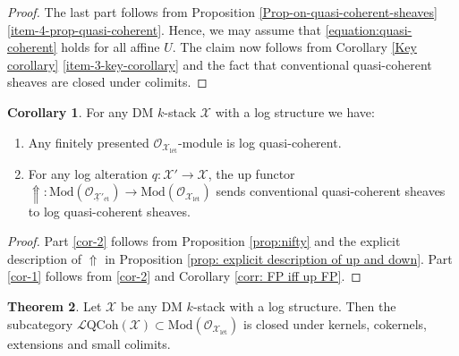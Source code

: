 \documentclass[11pt]{amsart}
\theoremstyle{definition}
\theoremstyle{definition}
\newtheorem{theorem}{Theorem}[subsection]
\newtheorem{corollary}[theorem]{Corollary}
\newcommand{\cL}{\mathcal{L}}
\newcommand{\cO}{\mathcal{O}}
\newcommand{\cX}{\mathcal{X}}
\newcommand{\ul}[1]{\underline{#1}}
\newcommand{\cal}{\mathcal}
\def\cL{{\cal L}}
\def\cO{{\cal O}}
\def\cX{{\cal X}}
\newcommand{\logqcoh}[1]{\cL \text{QCoh}(#1)}
\begin{document}
\begin{proof}
The last part follows from Proposition \ref{Prop-on-quasi-coherent-sheaves} \eqref{item-4-prop-quasi-coherent}. Hence, we may assume that \eqref{equation:quasi-coherent} holds for all affine $U$. The claim now follows from Corollary \ref{Key corollary} \eqref{item-3-key-corollary} and the fact that conventional quasi-coherent sheaves are closed under colimits.
\end{proof}
\begin{corollary}\label{key-corollary-quasi-coherent}
For any DM $k$-stack $\mathcal{X}$ with a log structure we have:
\begin{enumerate}
    \item\label{cor-1} Any finitely presented $\cO_{\cX_{\text{l\'et}}}$-module is log quasi-coherent.
    \item\label{cor-2} For any log alteration $q\colon \mathcal{X}'\rightarrow \mathcal{X}$, the up functor $\Uparrow\colon \text{Mod}(\mathcal{O}_{\ul{\mathcal{X}}{}'_{\text{\'et}}})\rightarrow\text{Mod}(\mathcal{O}_{\mathcal{X}_{\text{l\'et}}})$ sends conventional quasi-coherent sheaves to log quasi-coherent sheaves.
\end{enumerate}
\end{corollary} 
\begin{proof}
Part \eqref{cor-2} follows from Proposition \ref{prop:nifty} and the explicit description of $\Uparrow$ in Proposition \ref{prop: explicit description of up and down}. Part \eqref{cor-1} follows from \eqref{cor-2} and Corollary \ref{corr: FP iff up FP}.
\end{proof}
\begin{theorem}\label{thm-category-of-quasi-coherent-sheaves}
Let $\mathcal{X}$ be any DM $k$-stack with a log structure. Then the subcategory $\logqcoh{\mathcal{X}}\subset \text{Mod}(\mathcal{O}_{\mathcal{X}_{\text{l\'et}}})$ is closed under kernels, cokernels, extensions and small colimits.
\end{theorem}
\end{document}
